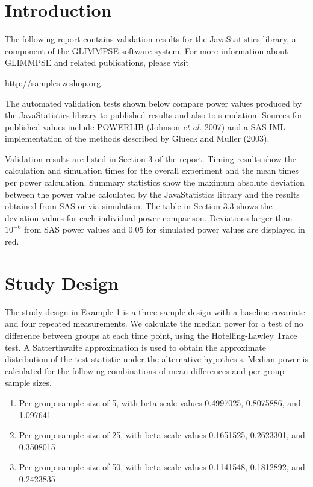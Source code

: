 \documentclass{glimmpse-report}
\begin{document}
\section{Introduction}
The following report contains validation results for the JavaStatistics library, a component of the GLIMMPSE software system.  For more information about GLIMMPSE and related publications, please visit



\href{http://samplesizeshop.org}{http://samplesizeshop.org}.

The automated validation tests shown below compare power values produced by the JavaStatistics library to published results and also to simulation.  Sources for published values include POWERLIB (Johnson \emph{et al.} 2007) and a SAS IML implementation of the methods described by Glueck and Muller (2003).

Validation results are listed in Section 3 of the report.  Timing results show the calculation and simulation times for the overall experiment and the mean times per power calculation.  Summary statistics show the maximum absolute deviation between the power value calculated by the JavaStatistics library and the results obtained from SAS or via simulation.  The table in Section 3.3 shows the deviation values for each individual power comparison.  Deviations larger than $10^{-6}$ from SAS power values and $0.05$ for simulated power values are displayed in red.

 \section{Study Design}
The study design in Example 1 is a three sample design with a baseline covariate and four repeated measurements.  We calculate the median power for a test of no difference between groups at each time point, using the Hotelling-Lawley Trace test.  A Satterthwaite approximation is used to obtain the approximate distribution of the test statistic under the alternative hypothesis.  Median power is calculated for the following combinations of mean differences and per group sample sizes.

\begin{enumerate}\item Per group sample size of 5, with beta scale values 0.4997025, 0.8075886, and 1.097641\item Per group sample size of 25, with beta scale values 0.1651525, 0.2623301, and 0.3508015\item Per group sample size of 50, with beta scale values 0.1141548,  0.1812892, and  0.2423835
\end{enumerate}
\end{document}
